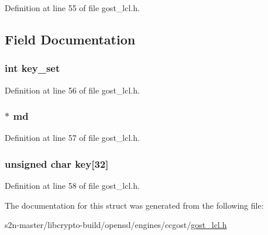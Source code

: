 Definition at line 55 of file gost\+\_\+lcl.\+h.



\subsection{Field Documentation}
\subsubsection[{\texorpdfstring{key\+\_\+set}{key_set}}]{\setlength{\rightskip}{0pt plus 5cm}int key\+\_\+set}\hypertarget{structgost__mac__pmeth__data_a77761b1f4ad7895ba894c134c03b98df}{}\label{structgost__mac__pmeth__data_a77761b1f4ad7895ba894c134c03b98df}


Definition at line 56 of file gost\+\_\+lcl.\+h.

\subsubsection[{\texorpdfstring{md}{md}}]{$\ast$ md}\hypertarget{structgost__mac__pmeth__data_a53c8a7a6089e9083cf1822014950084d}{}\label{structgost__mac__pmeth__data_a53c8a7a6089e9083cf1822014950084d}


Definition at line 57 of file gost\+\_\+lcl.\+h.

\subsubsection[{\texorpdfstring{key}{key}}]{\setlength{\rightskip}{0pt plus 5cm}unsigned char key\mbox{[}32\mbox{]}}\hypertarget{structgost__mac__pmeth__data_ad4cac93cc3b317b801edca4af3b610d3}{}\label{structgost__mac__pmeth__data_ad4cac93cc3b317b801edca4af3b610d3}


Definition at line 58 of file gost\+\_\+lcl.\+h.



The documentation for this struct was generated from the following file\+:\begin{DoxyCompactItemize}
\item 
s2n-\/master/libcrypto-\/build/openssl/engines/ccgost/\hyperlink{gost__lcl_8h}{gost\+\_\+lcl.\+h}\end{DoxyCompactItemize}
